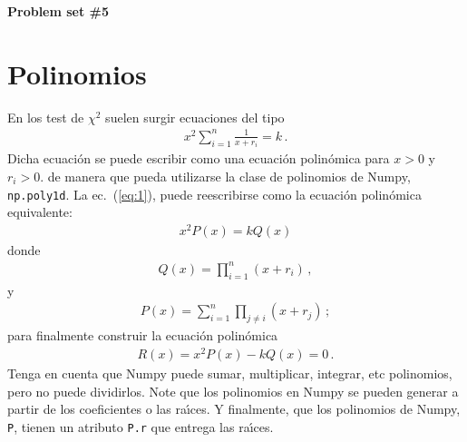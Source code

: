 \documentclass[12pt]{article}
\begin{document}
\noindent{}\hrulefill{}
\begin{flushright}
  \textbf{\large{Problem set \#5}}
\end{flushright}
\tableofcontents{}
\noindent{}\hrulefill{}
\section{Polinomios}
En los test de $\chi^2$ suelen surgir ecuaciones del tipo
\begin{align}
\label{eq:1}
  x^2\sum_{i=1}^n\frac{1}{x+r_i}=k\,.
\end{align}
Dicha ecuaci\'on se puede escribir como una ecuaci\'on polin\'omica para $x>0$ y $r_i>0$. de manera que pueda utilizarse la clase de polinomios de Numpy, \texttt{np.poly1d}. La ec.~(\ref{eq:1}), puede reescribirse como la ecuaci\'on polin\'omica equivalente:
\begin{align}
  x^2P(x)=k Q(x)
\end{align}
donde
\begin{align}
  Q(x)=\prod_{i=1}^n(x+r_i)\,,
\end{align}
y
\begin{align}
  P(x)=\sum_{i=1}^n\prod_{j\neq i}(x+r_j)\,;
\end{align}
para finalmente construir la ecuaci\'on polin\'omica
\begin{align}
  R(x)= x^2P(x)-k Q(x)=0\,.
\end{align}
Tenga en cuenta que Numpy puede sumar, multiplicar, integrar, etc polinomios, pero no puede dividirlos. Note que los polinomios en Numpy se pueden generar a partir de los coeficientes o las ra\'\i ces. Y finalmente, que  los polinomios de Numpy, \texttt{P}, tienen un atributo \texttt{P.r} que entrega las ra\'\i ces.  
\end{document}
